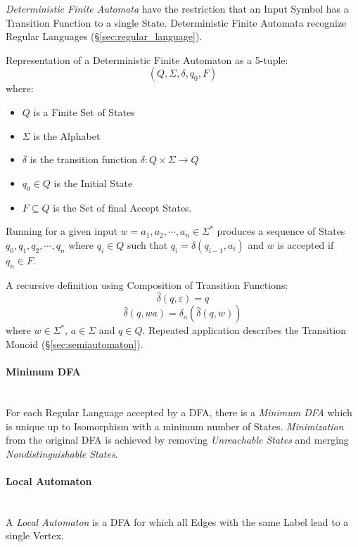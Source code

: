 \emph{Deterministic Finite Automata} have the restriction that an
Input Symbol has a Transition Function to a single State.
Deterministic Finite Automata recognize Regular
Languages (\S\ref{sec:regular_language}).

Representation of a Deterministic Finite Automaton as a 5-tuple:
\[
  (Q,\Sigma,\delta,q_0,F)
\]
where:
\begin{itemize}
  \item $Q$ is a Finite Set of States
  \item $\Sigma$ is the Alphabet
  \item $\delta$ is the transition function $\delta: Q \times
    \Sigma \rightarrow Q$
  \item $q_0 \in Q$ is the Initial State
  \item $F \subseteq Q$ is the Set of final Accept States.
\end{itemize}

Running for a given input $w = a_1,a_2, \cdots , a_n \in \Sigma^*$
produces a sequence of States $q_0,q_1,q_2,\cdots , q_n$ where $q_i
\in Q$ such that $q_i = \delta (q_{i-1},a_i)$ and $w$ is accepted if
$q_n \in F$.

A recursive definition using Composition of Transition Functions:
\[
  \widehat{\delta}(q,\varepsilon) = q
\]\[
  \widehat{\delta}(q,wa) = \delta_a(\widehat{\delta}(q,w))
\]
where $w \in \Sigma^*$, $a \in \Sigma$ and $q \in Q$. Repeated
application describes the Transition Monoid
(\S\ref{sec:semiautomaton}).



\paragraph{Minimum DFA}\label{sec:minimum_dfa}\hfill \\

For each Regular Language accepted by a DFA, there is a \emph{Minimum
  DFA} which is unique up to Isomorphism with a minimum number of
States. \emph{Minimization} from the original DFA is achieved by
removing \emph{Unreachable States} and merging
\emph{Nondistinguishable States}.



\paragraph{Local Automaton}\label{sec:local_automaton}\hfill \\

A \emph{Local Automaton} is a DFA for which all Edges with the same
Label lead to a single Vertex.


